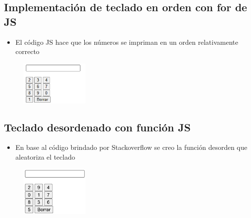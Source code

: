 \documentclass{article}
\begin{document}
	\subsection{Implementación de teclado en orden con for de JS}
	
	\begin{itemize}	
		\item El código JS hace que los números se impriman en un orden relativamente correcto
	\end{itemize}
	
	\begin{figure}[H]
		\centering
		\includegraphics[width=0.3\textwidth,keepaspectratio]{img/tec01.png}
	\end{figure}
\subsection{Teclado desordenado con función JS}
	
	\begin{itemize}	
		\item En base al código brindado por Stackoverflow se creo la
		 función desorden que aleatoriza el teclado
	\end{itemize}
	
	\begin{figure}[H]
		\centering
		\includegraphics[width=0.3\textwidth,keepaspectratio]{img/tec02.png}
	\end{figure}
\end{document}
